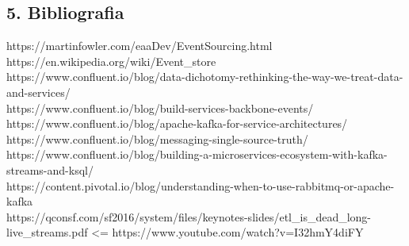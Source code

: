 \documentclass[]{article}
\begin{document}
\newpage

\subsection{5. Bibliografia}\label{bibliografia}

https://martinfowler.com/eaaDev/EventSourcing.html\\
https://en.wikipedia.org/wiki/Event\_store\\
https://www.confluent.io/blog/data-dichotomy-rethinking-the-way-we-treat-data-and-services/\\
https://www.confluent.io/blog/build-services-backbone-events/\\
https://www.confluent.io/blog/apache-kafka-for-service-architectures/\\
https://www.confluent.io/blog/messaging-single-source-truth/\\
https://www.confluent.io/blog/building-a-microservices-ecosystem-with-kafka-streams-and-ksql/\\
https://content.pivotal.io/blog/understanding-when-to-use-rabbitmq-or-apache-kafka\\
https://qconsf.com/sf2016/system/files/keynotes-slides/etl\_is\_dead\_long-live\_streams.pdf
\textless{}= https://www.youtube.com/watch?v=I32hmY4diFY
\end{document}
